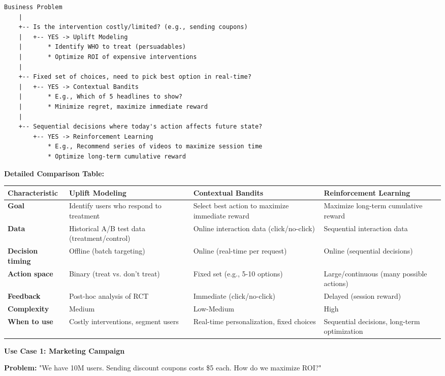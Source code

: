 \documentclass[10pt]{article}
\begin{document}
\begin{verbatim}
Business Problem
    |
    +-- Is the intervention costly/limited? (e.g., sending coupons)
    |   +-- YES -> Uplift Modeling
    |       * Identify WHO to treat (persuadables)
    |       * Optimize ROI of expensive interventions
    |
    +-- Fixed set of choices, need to pick best option in real-time?
    |   +-- YES -> Contextual Bandits
    |       * E.g., Which of 5 headlines to show?
    |       * Minimize regret, maximize immediate reward
    |
    +-- Sequential decisions where today's action affects future state?
        +-- YES -> Reinforcement Learning
            * E.g., Recommend series of videos to maximize session time
            * Optimize long-term cumulative reward
\end{verbatim}

\textbf{Detailed Comparison Table:}

\begin{tabular}{|p{2.5cm}|p{3.5cm}|p{3.5cm}|p{3.5cm}|}
\hline
\textbf{Characteristic} & \textbf{Uplift Modeling} & \textbf{Contextual Bandits} & \textbf{Reinforcement Learning} \\
\hline
\textbf{Goal} & Identify users who respond to treatment & Select best action to maximize immediate reward & Maximize long-term cumulative reward \\
\hline
\textbf{Data} & Historical A/B test data (treatment/control) & Online interaction data (click/no-click) & Sequential interaction data \\
\hline
\textbf{Decision timing} & Offline (batch targeting) & Online (real-time per request) & Online (sequential decisions) \\
\hline
\textbf{Action space} & Binary (treat vs. don't treat) & Fixed set (e.g., 5-10 options) & Large/continuous (many possible actions) \\
\hline
\textbf{Feedback} & Post-hoc analysis of RCT & Immediate (click/no-click) & Delayed (session reward) \\
\hline
\textbf{Complexity} & Medium & Low-Medium & High \\
\hline
\textbf{When to use} & Costly interventions, segment users & Real-time personalization, fixed choices & Sequential decisions, long-term optimization \\
\hline
\end{tabular}

\textbf{Use Case 1: Marketing Campaign}

\textbf{Problem:} "We have 10M users. Sending discount coupons costs \$5 each. How do we maximize ROI?"
\end{document}
